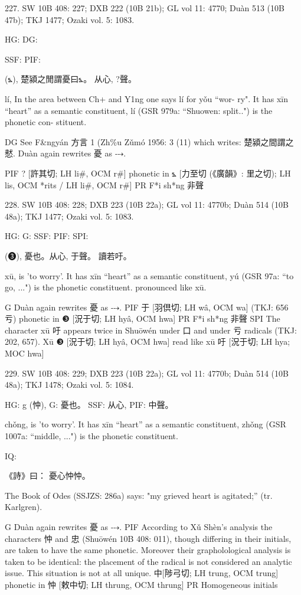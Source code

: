 227. SW 10B 408: 227; DXB 222 (10B 21b); GL vol 11: 4770; Duàn 513 (10B 47b); TKJ 1477; Ozaki vol. 5: 1083.


HG:
DG:

SSF: PIF:

(⦩),
楚潁之閒謂憂曰⦩。 从心,
?聲。

lí,
In the area between Ch+ and Y1ng one says lí for yǒu ``wor- ry".
It has xīn ``heart'' as a semantic constituent,
lí (GSR 979a: ``Shuowen: split..") is the phonetic con- stituent.

DG	See F&ngyán 方言 1 (Zh\%u Zǔmó 1956: 3 (11) which writes: 楚潁之間謂之憖.
Duàn again rewrites 憂 as ⤏.



PIF     ? [許其切; LH li\#, OCM r\#] phonetic in ⦩ [力至切 (《廣韻》: 里之切); LH lis, OCM
*rits / LH li\#, OCM r\#]
PR	F*i sh*ng 非聲

228. SW 10B 408: 228; DXB 223 (10B 22a); GL vol 11: 4770b; Duàn 514 (10B 48a); TKJ 1477; Ozaki vol. 5: 1083.


HG:
G: SSF: PIF: SPI:

(❸),
憂也。从心, 于聲。
讀若吁。

xū,
is 'to worry'.
It has xīn ``heart'' as a semantic constituent,
yú (GSR 97a: ``to go, ...") is the phonetic constituent. pronounced like xū.

G	Duàn again rewrites 憂 as ⤏.
PIF     于 [羽倶切; LH wâ, OCM wa] (TKJ: 656 亏) phonetic in ❸ [況于切; LH hyâ, OCM hwa]
PR	F*i sh*ng 非聲
SPI     The character xū 吁 appears twice in Shuōwén under 口 and under 亏 radicals (TKJ: 202, 657).
Xū ❸ [況于切; LH hyâ, OCM hwa] read like xū 吁 [況于切; LH hya; MOC hwa]

229. SW 10B 408: 229; DXB 223 (10B 22a); GL vol 11: 4770b; Duàn 514 (10B 48a); TKJ 1478; Ozaki vol. 5: 1084.

HG: g (忡),
G:	憂也。
SSF: 从心,
PIF: 中聲。


chǒng,
is 'to worry'.
It has xīn ``heart'' as a semantic constituent,
zhǒng (GSR 1007a: ``middle, ...") is the phonetic constituent.

IQ:

《詩》曰： 憂心忡忡。

The Book of Odes (SSJZS: 286a) says:
"my grieved heart is agitated;'' (tr. Karlgren).

G    Duàn again rewrites 憂 as ⤏.
PIF According to Xǔ Shèn's analysis the characters 忡 and 忠 (Shuōwén 10B 408: 011), though differing in their initials, are taken to have the same phonetic. Moreover their grapholological analysis is taken to be identical: the placement of the radical is not considered an analytic issue. This situation is not at all unique.
中[陟弓切; LH trung, OCM trung] phonetic in 忡 [敕中切; LH thrung, OCM thrung]
PR   Homogeneous initials



